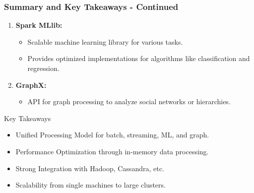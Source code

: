 \documentclass[aspectratio=169]{beamer}
\begin{document}
\begin{frame}[fragile]
    \frametitle{Summary and Key Takeaways - Continued}
    \begin{enumerate}[resume]
        \item \textbf{Spark MLlib:}
            \begin{itemize}
                \item Scalable machine learning library for various tasks.
                \item Provides optimized implementations for algorithms like classification and regression.
            \end{itemize}
        \item \textbf{GraphX:}
            \begin{itemize}
                \item API for graph processing to analyze social networks or hierarchies.
            \end{itemize}
    \end{enumerate}

    \begin{block}{Key Takeaways}
        \begin{itemize}
            \item Unified Processing Model for batch, streaming, ML, and graph.
            \item Performance Optimization through in-memory data processing.
            \item Strong Integration with Hadoop, Cassandra, etc.
            \item Scalability from single machines to large clusters.
        \end{itemize}
    \end{block}
\end{frame}
\end{document}
